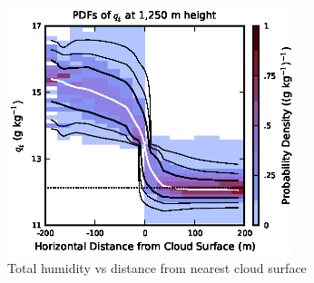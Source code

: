 \documentclass[acp]{copernicus}
\begin{document}
\begin{figure}[t]
\vspace*{2mm}
\begin{center}
\includegraphics[width=8.3cm]{./figures/qt_vs_dist}
\end{center}
\caption{Total humidity vs distance from nearest cloud surface}
\label{fig:qt_vs_dist}
\end{figure}





\end{document}
